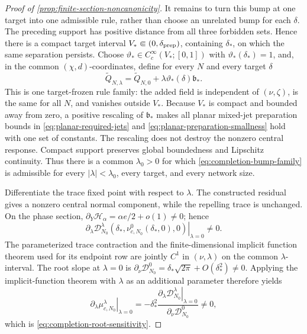 \begin{proof}[Proof of \cref{prop:finite-section-noncanonicity}]
It remains to turn this bump at one target into one admissible rule, rather
than choose an unrelated bump for each \(\delta\).  The preceding support has
positive distance from all three forbidden sets.  Hence there is a compact
target interval \(V_*\Subset(0,\delta_{\rm prep})\), containing
\(\delta_*\), on which the same separation persists.  Choose
\(\vartheta_*\in C_c^\infty(V_*;[0,1])\) with
\(\vartheta_*(\delta_*)=1\), and, in the common \((\chi,d)\)-coordinates,
define for every \(N\) and every target \(\delta\)
\begin{equation}
 \widetilde Q_{N,\lambda}
 =\widetilde Q_{N,0}
   +\lambda\vartheta_*(\delta)\mathfrak b_* .         \label{eq:completion-bump-family}
\end{equation}
This is one target-frozen rule family: the added field is independent of
\((\nu,\zeta)\), is the same for all \(N\), and vanishes outside \(V_*\).
Because \(V_*\) is compact and bounded away from zero, a positive rescaling
of \(\mathfrak b_*\) makes all planar mixed-jet preparation bounds in
\cref{eq:planar-required-jets} and
\cref{eq:planar-preparation-smallness} hold with one set of constants.
The rescaling does not destroy the nonzero central response.  Compact support
preserves global boundedness and Lipschitz continuity.  Thus there is a common
\(\lambda_0>0\) for which \cref{eq:completion-bump-family} is admissible for
every \(|\lambda|<\lambda_0\), every target, and every network size.

Differentiate the trace fixed point with respect to \(\lambda\).  The
constructed residual gives a nonzero central normal component, while the
repelling trace is unchanged.  On the phase section,
\(\partial_Y\mathscr H_\alpha=\alpha e/2+o(1)\ne0\); hence
\[
 \left.\partial_\lambda
   \mathscr D^\lambda_{N_0}
      (\delta_*,\nu^{0}_{c,N_0}(\delta_*,0),0)\right|_{\lambda=0}
 \ne0.
\]
The parameterized trace contraction and the finite-dimensional implicit
function theorem used for its endpoint row are jointly \(C^1\) in
\((\nu,\lambda)\) on the common \(\lambda\)-interval.  The root slope at
\(\lambda=0\) is
\(\partial_\nu\mathscr D^0_{N_0}
 =\delta_*\sqrt{2\pi}+O(\delta_*^2)\ne0\).  Applying the implicit-function
theorem with \(\lambda\) as an additional parameter therefore yields
\[
 \left.\partial_\lambda\mu^\lambda_{c,N_0}\right|_{\lambda=0}
 =-\delta_*^2
 \frac{\left.\partial_\lambda\mathscr D^\lambda_{N_0}\right|_{\lambda=0}}
      {\partial_\nu\mathscr D^0_{N_0}}
 \ne0,
\]
which is \cref{eq:completion-root-sensitivity}.
\end{proof}

